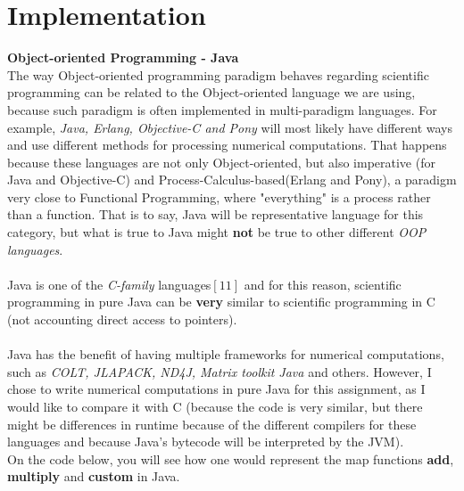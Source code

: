 \documentclass[conference]{IEEEtran}
\begin{document}
\section{Implementation}

\textbf{ Object-oriented Programming - Java }\\
The way Object-oriented programming paradigm behaves regarding scientific programming can be related to the Object-oriented language we are using, because such paradigm is often implemented in multi-paradigm languages. For example, \textit{Java, Erlang, Objective-C and Pony} will most likely have different ways and use different methods for processing numerical computations. That happens because these languages are not only Object-oriented, but also imperative (for Java and Objective-C) and Process-Calculus-based(Erlang and Pony), a paradigm very close to Functional Programming, where "everything" is a process rather than a function. That is to say, Java will be representative language for this category, but what is true to Java might \textbf{not} be true to other different \textit{OOP languages}.
\\\\
Java is one of the \textit{C-family} languages$[11]$ and for this reason, scientific programming in pure Java can be \textbf{very} similar to scientific programming in C (not accounting direct access to pointers).
\\\\
Java has the benefit of having multiple frameworks for numerical computations, such as \textit{COLT, JLAPACK, ND4J, Matrix toolkit Java} and others. However, I chose to write numerical computations in pure Java for this assignment, as I would like to compare it with C (because the code is very similar, but there might be differences in runtime because of the different compilers for these languages and because Java's bytecode will be interpreted by the JVM). 
\\
On the code below, you will see how one would represent the map functions \textbf{add}, \textbf{multiply} and \textbf{custom} in Java.
\\
\end{document}
